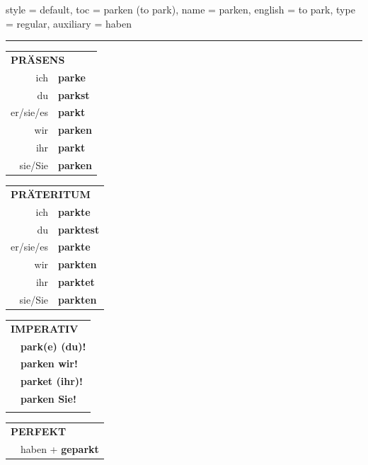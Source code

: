 \begin{verbentry}{
  style = {default},
  toc = {parken (to park)},
  name = {parken},
  english = {to park},
  type = {regular},
  auxiliary = {haben}
}
 
    
     \vspace{5pt}

    \hrule
    
    \vspace{5pt}

  \begin{tabular}{rl}
     \multicolumn{2}{l}{\textbf{PRÄSENS} }\\
    ich & \textbf{parke}\\
    du & \textbf{parkst}\\
    er/sie/es & \textbf{parkt}\\
    wir & \textbf{parken}\\
    ihr & \textbf{parkt}\\
    sie/Sie & \textbf{parken}\\
  \end{tabular}
  \hfill
     \begin{tabular}{rl}
    \multicolumn{2}{l}{\textbf{PRÄTERITUM} }\\
    ich & \textbf{parkte}\\
    du & \textbf{parktest}\\
    er/sie/es & \textbf{parkte}\\
    wir & \textbf{parkten}\\
    ihr & \textbf{parktet}\\
    sie/Sie & \textbf{parkten}\\
  \end{tabular}
  \hfill
  \begin{tabular}{rl}
     \multicolumn{2}{l}{\textbf{IMPERATIV} }\\
   & \textbf{park(e) (du)!}\\
   & \textbf{parken wir!}\\
   & \textbf{parket (ihr)!}\\
   & \textbf{parken Sie!}\\
   & \vspace{10pt}
  \end{tabular}

    \vspace{10pt}

 \begin{tabular}{rl}
     \multicolumn{2}{l}{\textbf{PERFEKT}}\\
  &  haben + \textbf{geparkt}\\
  \end{tabular}
\hfill
   \begin{tabular}{rl}
   

\end{tabular}
\end{verbentry}
